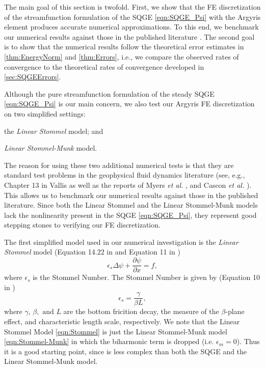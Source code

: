 The main goal of this section is twofold. First, we show that the FE
discretization of the streamfunction formulation of the SQGE \eqref{eqn:SQGE_Psi}
with the Argyris element produces accurate numerical approximations. To this
end, we benchmark our numerical results against those in the published
literature \cite{Vallis06, Cascon, Myers}. The second goal is to show that the
numerical results follow the theoretical error estimates in
\autoref{thm:EnergyNorm} and \autoref{thm:Errors}, i.e., we compare the observed
rates of convergence to the theoretical rates of convergence developed in
\autoref{sec:SQGEErrors}.

Although the pure streamfunction formulation of the steady SQGE
\eqref{eqn:SQGE_Psi} is our main concern, we also test our Argyris FE
discretization on two simplified settings: \begin{inparaenum}[(i)] \item the
\emph{Linear Stommel} model; and \item \emph{Linear Stommel-Munk} model.
\end{inparaenum} The reason for using these two additional numerical tests is
that they are standard test problems in the geophysical fluid dynamics
literature (see, e.g., Chapter 13 in Vallis \cite{Vallis06} as well as the
reports of Myers \emph{et al.} \cite{Myers}, and Cascon \emph{et al.}
\cite{Cascon}). This allows us to benchmark our numerical results against
those in the published literature. Since both the Linear Stommel and the
Linear Stommel-Munk models lack the nonlinearity present in the SQGE
\eqref{eqn:SQGE_Psi}, they represent good stepping stones to verifying our FE
discretization.

The first simplified model used in our numerical investigation is the
\emph{Linear Stommel} model (Equation 14.22 in \cite{Vallis06} and Equation 11
in \cite{Myers})
\begin{equation}
  \epsilon_s \Delta \psi + \frac{\partial \psi}{\partial x} = f,
  \label{eqn:Stommel}
\end{equation}
where $\epsilon_s$ is the Stommel Number. The Stommel Number is given by
(Equation 10 in \cite{Myers})
\begin{equation*}
  \epsilon_s = \frac{\gamma}{\beta L},
\end{equation*}
where $\gamma,\, \beta, \text{ and } L$ are the bottom fricition decay, the
measure of the $\beta$-plane effect, and characteristic length scale,
respectively. We note that the Linear Stommel Model \eqref{eqn:Stommel} is just
the Linear Stommel-Munk model \eqref{eqn:Stommel-Munk} in which the biharmonic
term is dropped (i.e. $\epsilon_m=0$). Thus it is a good starting point, since
is less complex than both the SQGE and the Linear Stommel-Munk model.

